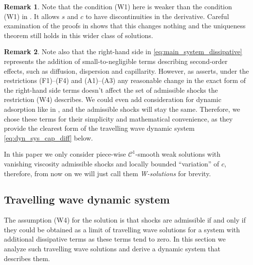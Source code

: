 \documentclass[12pt]{article}
\theoremstyle{definition}
\newtheorem{remark}{Remark}
\begin{document}
\begin{remark}
Note that the condition (W1) here is weaker than the condition (W1) in \cite{MR2024}. It allows $s$ and $c$ to have discontinuities in the derivative. Careful examination of the proofs in \cite{MR2024} shows that this changes nothing and the uniqueness theorem still holds in this wider class of solutions.
\end{remark}
\begin{remark}
Note also that the right-hand side in \eqref{eq:main_system_dissipative} represents the addition of small-to-negligible terms describing second-order effects, such as diffusion, dispersion and capillarity. However, as \cite[Section 3.1]{MR2024} asserts, under the restrictions (F1)--(F4) and (A1)--(A3) any reasonable change in the exact form of the right-hand side terms doesn't affect the set of admissible shocks the restriction (W4) describes. We could even add consideration for dynamic adsorption like in \cite[(3)]{Bahetal}, and the admissible shocks will stay the same. Therefore, we chose these terms for their simplicity and mathematical convenience, as they provide the clearest form of the travelling wave dynamic system \eqref{eq:dyn_sys_cap_diff} below.
\end{remark}

In this paper we only consider piece-wise $\mathcal C^1$-smooth weak solutions with vanishing viscosity admissible shocks and locally bounded ``variation'' of $c$, therefore, from now on we will just call them \emph{W-solutions} for brevity.




\subsection{Travelling wave dynamic system}
\label{sec:sec2-Hopf}
The assumption (W4) for the solution is that shocks are admissible if and only if they could be obtained as a limit of travelling wave solutions for a system with additional dissipative terms as these terms tend to zero. In this section we analyze such travelling wave solutions and derive a dynamic system that describes them.
\end{document}
